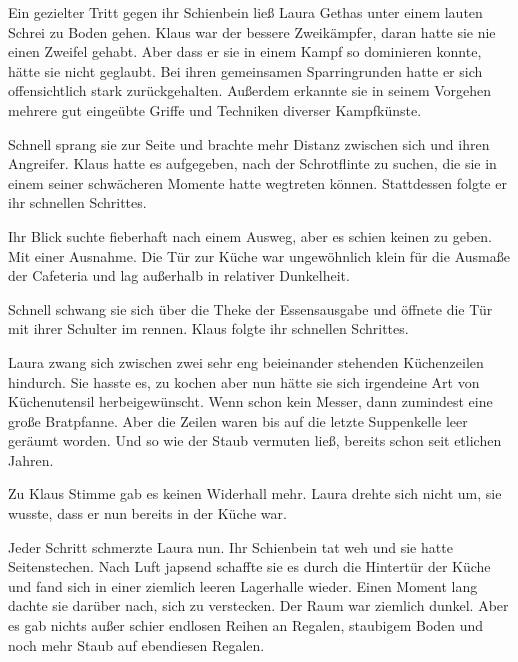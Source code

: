 Ein gezielter Tritt gegen ihr Schienbein ließ Laura Gethas unter einem lauten Schrei zu Boden gehen. Klaus war der bessere Zweikämpfer, daran hatte sie nie einen Zweifel gehabt. Aber dass er sie in einem Kampf so dominieren konnte, hätte sie nicht geglaubt. Bei ihren gemeinsamen Sparringrunden hatte er sich offensichtlich stark zurückgehalten. Außerdem erkannte sie in seinem Vorgehen mehrere gut eingeübte Griffe und Techniken diverser Kampfkünste.

\par

Schnell sprang sie zur Seite und brachte mehr Distanz zwischen sich und ihren Angreifer. Klaus hatte es aufgegeben, nach der Schrotflinte zu suchen, die sie in einem seiner schwächeren Momente hatte wegtreten können. Stattdessen folgte er ihr schnellen Schrittes.

\par

Ihr Blick suchte fieberhaft nach einem Ausweg, aber es schien keinen zu geben. Mit einer Ausnahme. Die Tür zur Küche war ungewöhnlich klein für die Ausmaße der Cafeteria und lag außerhalb in relativer Dunkelheit.

\par

Schnell schwang sie sich über die Theke der Essensausgabe und öffnete die Tür mit ihrer Schulter im rennen. Klaus folgte ihr schnellen Schrittes. 

\par

Laura zwang sich zwischen zwei sehr eng beieinander stehenden Küchenzeilen hindurch. Sie hasste es, zu kochen aber nun hätte sie sich irgendeine Art von Küchenutensil herbeigewünscht. Wenn schon kein Messer, dann zumindest eine große Bratpfanne. Aber die Zeilen waren bis auf die letzte Suppenkelle leer geräumt worden. Und so wie der Staub vermuten ließ, bereits schon seit etlichen Jahren.

\par

Zu Klaus Stimme gab es keinen Widerhall mehr. Laura drehte sich nicht um, sie wusste, dass er nun bereits in der Küche war. 

\par

Jeder Schritt schmerzte Laura nun. Ihr Schienbein tat weh und sie hatte Seitenstechen. Nach Luft japsend schaffte sie es durch die Hintertür der Küche und fand sich in einer ziemlich leeren Lagerhalle wieder. Einen Moment lang dachte sie darüber nach, sich zu verstecken. Der Raum war ziemlich dunkel. Aber es gab nichts außer schier endlosen Reihen an Regalen, staubigem Boden und noch mehr Staub auf ebendiesen Regalen.

